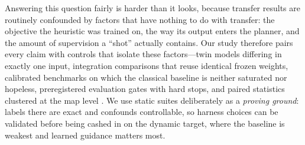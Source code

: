 \documentclass[letterpaper]{article} %
\begin{document}
Answering this question fairly is harder than it looks, because transfer results are routinely confounded by factors that have nothing to do with transfer: the objective the heuristic was trained on, the way its output enters the planner, and the amount of supervision a ``shot'' actually contains. Our study therefore pairs every claim with controls that isolate these factors---twin models differing in exactly one input, integration comparisons that reuse identical frozen weights, calibrated benchmarks on which the classical baseline is neither saturated nor hopeless, preregistered evaluation gates with hard stops, and paired statistics clustered at the map level \citep{henderson2018matters,agarwal2021precipice,pineau2021reproducibility}. We use static suites deliberately as a \emph{proving ground}: labels there are exact and confounds controllable, so harness choices can be validated before being cashed in on the dynamic target, where the baseline is weakest and learned guidance matters most.
\end{document}
